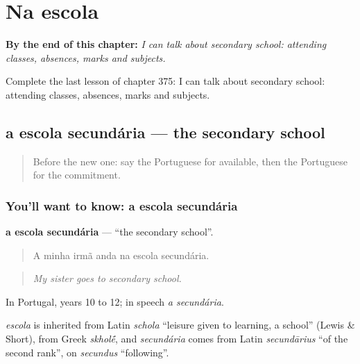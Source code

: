 
\chapter{Na escola}
\label{ch:pt-na-escola}

\begin{chapteropening}
\textbf{By the end of this chapter:} \emph{I can talk about secondary school: attending classes, absences, marks and subjects.}

Complete the last lesson of chapter 375: I can talk about secondary school: attending classes, absences, marks and subjects.
\end{chapteropening}

\section[a escola secundária]{a escola secundária — the secondary school}

\label{lesson:PT-C375-escola-secundaria}



\begin{quote}
Before the new one: say the Portuguese for available, then the Portuguese for the commitment.
\end{quote}

\subsection*{You'll want to know: a escola secundária}
\textbf{a escola secundária} — \textquotedblleft{}the secondary school\textquotedblright{}.

\begin{quote}
A minha irmã anda na escola secundária.
\end{quote}

\begin{quote}
\emph{My sister goes to secondary school.}
\end{quote}

In Portugal, years 10 to 12; in speech \emph{a secundária}.

\begin{cousinweb}
\emph{escola} is inherited from Latin \emph{schola} \textquotedblleft{}leisure given to learning, a school\textquotedblright{} (Lewis \& Short), from Greek \emph{skhol\'{\={e}}}, and \emph{secundária} comes from Latin \emph{secundārius} \textquotedblleft{}of the second rank\textquotedblright{}, on \emph{secundus} \textquotedblleft{}following\textquotedblright{}.
\end{cousinweb}

